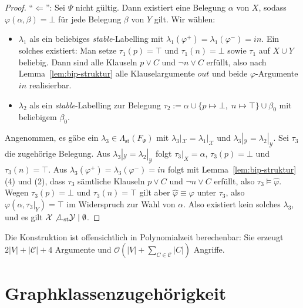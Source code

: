 \begin{proof}
    \enquote{\(\Leftarrow\)}: Sei \(\Psi\) nicht gültig. Dann existiert eine
    Belegung \(\alpha\) von \(X\), sodass \(\varphi(\alpha,\beta)=\bot\) für
    jede Belegung \(\beta\) von \(Y\) gilt. Wir wählen:
    \begin{itemize}
        \item \(\lambda_1\) als ein beliebiges \textit{stable}-Labelling mit
        \(\lambda_1(\varphi^{+})=\lambda_1(\varphi^{-})=\mathit{in}\). Ein
        solches existiert: Man setze \(\tau_1(p)=\top\) und \(\tau_1(n)=\bot\)
        sowie \(\tau_1\) auf \(X\cup Y\) beliebig. Dann sind alle Klauseln
        \(p\lor C\) und \(\neg n\lor C\) erfüllt, also nach
        Lemma~\ref{lem:bip-struktur} alle Klauselargumente \(\mathit{out}\)
        und beide \(\varphi\)-Argumente \(\mathit{in}\) realisierbar.
        \item \(\lambda_2\) als ein \textit{stable}-Labelling zur Belegung
        \(\tau_2:=\alpha\cup\{p\mapsto\bot,\;n\mapsto\top\}\cup\beta_0\) mit
        beliebigem \(\beta_0\).
    \end{itemize}
    Angenommen, es gäbe ein \(\lambda_3\in\Lambda_{\mathrm{st}}(F_\Psi)\) mit
    \(\lambda_3|_{\mathcal{X}}=\lambda_1|_{\mathcal{X}}\) und
    \(\lambda_3|_{\mathcal{Y}}=\lambda_2|_{\mathcal{Y}}\). Sei \(\tau_3\) die
    zugehörige Belegung. Aus
    \(\lambda_3|_{\mathcal{Y}}=\lambda_2|_{\mathcal{Y}}\) folgt
    \(\tau_3|_X=\alpha\), \(\tau_3(p)=\bot\) und \(\tau_3(n)=\top\). Aus
    \(\lambda_3(\varphi^{+})=\lambda_3(\varphi^{-})=\mathit{in}\) folgt mit
    Lemma~\ref{lem:bip-struktur}(4) und (2), dass \(\tau_3\) sämtliche Klauseln
    \(p\lor C\) und \(\neg n\lor C\) erfüllt, also
    \(\tau_3\models\widehat{\varphi}\). Wegen \(\tau_3(p)=\bot\) und
    \(\tau_3(n)=\top\) gilt aber \(\widehat{\varphi}\equiv\varphi\) unter
    \(\tau_3\), also \(\varphi(\alpha,\tau_3|_Y)=\top\) im Widerspruch zur Wahl
    von \(\alpha\). Also existiert kein solches \(\lambda_3\), und es gilt
    \(\mathcal{X}\not\bot_{\mathrm{st}}\mathcal{Y}\mid\emptyset\).
\end{proof}

Die Konstruktion ist offensichtlich in Polynomialzeit berechenbar: Sie erzeugt
\(2|V|+|\mathcal{C}|+4\) Argumente und
\(\mathcal{O}(|V|+\sum_{C\in\mathcal{C}}|C|)\) Angriffe.

\section{Graphklassenzugehörigkeit}
\label{sec:bip-analyse-bipartit}

